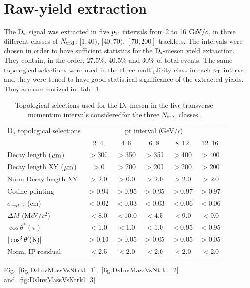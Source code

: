 \section {Raw-yield extraction}
\label{sec:Rawyields_vs_mult}
The ${\rm D_s}$ signal was extracted in five $p_{\rm T}$ intervals from 2 to 16 $\mathrm{GeV}/c$, 
in three different classes of $N_{\rm trkl}$: $[1,40)$, $[40,70)$, $[70,200]$ tracklets.
The intervals were chosen in order to have sufficient statistics for the ${\rm D_s}$-meson yield extraction.
They contain, in the order, 27.5\%, 40.5\% and 30\% of total events.
The same topological selections were used in the three multiplicity class in each $p_{\rm T}$
interval and they were tuned to have good statistical significance of the extracted yields.
They are summarized in Tab.~\ref{tab:cutsDsVsNtrkl}.
\begin{table}[h!]
\centering
\begin{tabular}{|l|c|c|c|c|c|}
\hline
${\rm D_s}$ topological selections & \multicolumn{5}{c|}{pt interval (GeV/$c$)}\\
\cline{2-6}
  & 2--4  & 4--6 & 6--8 & 8--12 & 12--16\\
\hline
Decay length ($\mathrm{\mu m}$)        & $>$300 & $>$350 & $>$350 & $>$400& $>$400\\
Decay length XY ($\mathrm{\mu m}$)     & $>$0 & $>$200 & $>$200 & $>$200 & $>$200\\
Norm Decay length XY          & $>$2.0& $>$0.0 & $>$2.0 & $>$2.0 & $>$2.0\\
Cosine pointing              & $>$0.94 & $>$0.95 & $>$0.95 & $>$0.97 & $>$0.97\\
$\sigma_{vertex}$  (cm)          & $<$0.02 & $<$0.03 & $<$0.03 & $<$0.06 & $<$0.06\\
$\Delta M$ (MeV/$c^{2}$) & $<$8.0 & $<$10.0 & $<$4.5 & $<$9.0 & $<$9.0\\
$\cos \theta^*(\pi)$    & $<$1.0 & $<$1.0 & $<$1.0 & $<$0.95 & $<$0.95\\
$|\cos^3 \theta^\prime({\rm K})|$        & $>$0.10 & $>$0.05 & $>$0.05 & $>$0.05 & $>$0.05\\
Norm. IP residual  & $<$2.5 & $<$2.0 & $<$2.0 & $<$2.0  & $<$2.0 \\
\hline
\end{tabular}
\caption{Topological selections used for the ${\rm D_s}$ meson in the five transverse momentum intervals consideredfor the three $N_{\rm trkl}$ classes.}
\label{tab:cutsDsVsNtrkl}
\end{table}
Fig.~\ref{fig:DsInvMassVsNtrkl_1},~\ref{fig:DsInvMassVsNtrkl_2} and~\ref{fig:DsInvMassVsNtrkl_3} 
